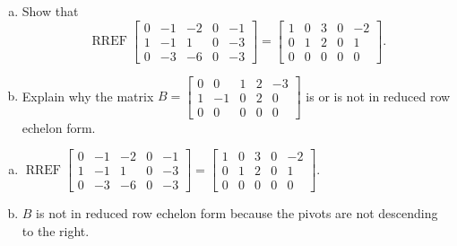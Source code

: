 
\begin{exerciseStatement}

\begin{enumerate}[(a)]
\item Show that \[\operatorname{RREF} \left[\begin{array}{ccccc}
0 & -1 & -2 & 0 & -1 \\
1 & -1 & 1 & 0 & -3 \\
0 & -3 & -6 & 0 & -3
\end{array}\right] = \left[\begin{array}{ccccc}
1 & 0 & 3 & 0 & -2 \\
0 & 1 & 2 & 0 & 1 \\
0 & 0 & 0 & 0 & 0
\end{array}\right] .\]
\item Explain why the matrix \(B= \left[\begin{array}{ccccc}
0 & 0 & 1 & 2 & -3 \\
1 & -1 & 0 & 2 & 0 \\
0 & 0 & 0 & 0 & 0
\end{array}\right] \) is or is not in reduced row echelon form.
\end{enumerate}
    
\end{exerciseStatement}
    
\begin{exerciseAnswer} 

\begin{enumerate}[(a)]
\item \(\operatorname{RREF} \left[\begin{array}{ccccc}
0 & -1 & -2 & 0 & -1 \\
1 & -1 & 1 & 0 & -3 \\
0 & -3 & -6 & 0 & -3
\end{array}\right] = \left[\begin{array}{ccccc}
1 & 0 & 3 & 0 & -2 \\
0 & 1 & 2 & 0 & 1 \\
0 & 0 & 0 & 0 & 0
\end{array}\right] .\)
\item \(B\) is not in reduced row echelon form because the pivots are not descending to the right. 
\end{enumerate}
    
\end{exerciseAnswer}
    
